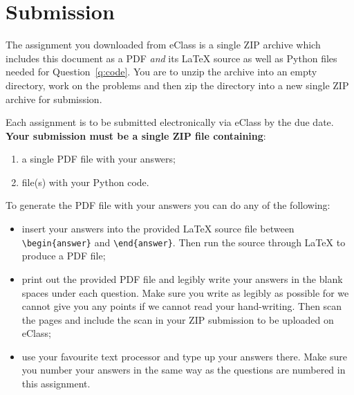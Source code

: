 \documentclass{article}
\begin{document}
\clearpage
\section*{Submission}
The assignment you downloaded from eClass is a single ZIP archive which includes this document as a PDF {\em and} its \LaTeX{} source as well as Python files needed for Question~\ref{q:code}.
%
You are to unzip the archive into an empty directory, work on the problems and then zip the directory into a new single ZIP archive for submission.

\medskip

Each assignment is to be submitted electronically via eClass by the due date.
\textbf{Your submission must be a single ZIP file containing}: 
\begin{enumerate}
    \item a single PDF file with your answers;
    \item file(s) with your Python code.
\end{enumerate}

To generate the PDF file with your answers you can do any of the following:

\begin{itemize}
    \item
    insert your answers into the provided \LaTeX{} source file between \verb|\begin{answer}| and \verb|\end{answer}|. Then run the source through \LaTeX{} to produce a PDF file;

    \item print out the provided PDF file and legibly write your answers in the blank spaces under each question. Make sure you write as legibly as possible for we cannot give you any points if we cannot read your hand-writing. Then scan the pages and include the scan in your ZIP submission to be uploaded on eClass;

    \item use your favourite text processor and type up your answers there. Make sure you number your answers in the same way as the questions are numbered in this assignment.
\end{itemize}

%
%
\end{document}
